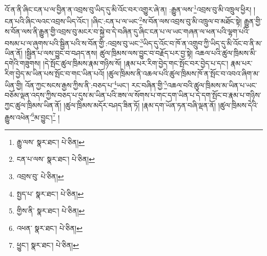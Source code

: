 འོ་ན་ནི་ཞིང་ངན་པ་ལ་བྱིན་ན་འབྲས་བུ་ཡིད་དུ་མི་འོང་བར་འགྱུར་ཞེ་ན། :རྒྱུན་ལས་\footnote{རྒྱུ་ལས་  སྣར་ཐང་།  པེ་ཅིན། }འབྲས་བུ་མི་འཁྲུལ་ཕྱིར། །ངན་པའི་ཞིང་ལའང་འབྲས་ཡིད་འོང་། །ཞིང་:ངན་པ་ལ་ཡང་\footnote{ངན་པ་ལས་  སྣར་ཐང་།  པེ་ཅིན། }ས་བོན་ལས་འབྲས་བུ་མི་འཁྲུལ་བ་མཐོང་སྟེ། རྒྱུན་གྱི་ས་བོན་ལས་ནི་རྒྱུན་གྱི་འབྲས་བུ་མངར་བ་སྐྱེ་བ་དེ་བཞིན་དུ་ཞིང་ངན་པ་ལ་ཡང་གཞན་ལ་ཕན་པའི་ལྷག་པའི་བསམ་པ་ལ་ཞུགས་པའི་སྦྱིན་པའི་ས་བོན་གྱི་:འབྲས་བུ་ཡང་\footnote{འབྲས་བུ་  པེ་ཅིན། }ཡིད་དུ་འོང་བ་ཁོ་ན་འགྲུབ་ཀྱི་ཡིད་དུ་མི་འོང་བ་ནི་མ་ཡིན་ནོ། །སྦྱིན་པ་ལས་བྱུང་བ་བཤད་ནས། ཚུལ་ཁྲིམས་ལས་བྱུང་བ་བརྗོད་པར་བྱ་སྟེ། འཆལ་པའི་ཚུལ་ཁྲིམས་མི་དགེའི་གཟུགས། །དེ་སྤོང་ཚུལ་ཁྲིམས་རྣམ་གཉིས་སོ། །རྣམ་པར་རིག་བྱེད་གང་སྤོང་བར་བྱེད་པ་དང་། རྣམ་པར་རིག་བྱེད་མ་ཡིན་པས་སྤོང་བ་གང་ཡིན་པའོ། །ཚུལ་ཁྲིམས་ནི་འཆལ་པའི་ཚུལ་ཁྲིམས་ཁོ་ན་སྤོང་བ་འབའ་ཞིག་མ་ཡིན་གྱི། འོན་ཀྱང་སངས་རྒྱས་ཀྱིས་ནི་:བཅད་པ་\footnote{སྤྱད་པ་  སྣར་ཐང་།  པེ་ཅིན། }ཡང་། རང་བཞིན་གྱི་\footnote{གྱིས་ནི་  སྣར་ཐང་།  པེ་ཅིན། }འཆལ་བའི་ཚུལ་ཁྲིམས་མ་ཡིན་པ་ཡང་བཅོམ་ལྡན་འདས་ཀྱིས་བཅད་པ་དུས་མ་ཡིན་པའི་ཟས་ལ་སོགས་པ་གང་དག་ཡིན་པ་དེ་དག་སྤོང་བ་རྣམ་པ་གཉིས་ཀྱང་ཚུལ་ཁྲིམས་ཡིན་ནོ། །ཚུལ་ཁྲིམས་མདོར་བཤད་ཟིན་ཏོ། །རྣམ་དག་ཡོན་ཏན་བཞི་ལྡན་ནོ། །ཚུལ་ཁྲིམས་དེའི་རྒྱུས་འཕེན་\footnote{འཕན་  སྣར་ཐང་།  པེ་ཅིན། }མ་བྱུང་།\footnote{ཕྱུང་།  སྣར་ཐང་།  པེ་ཅིན། } །
